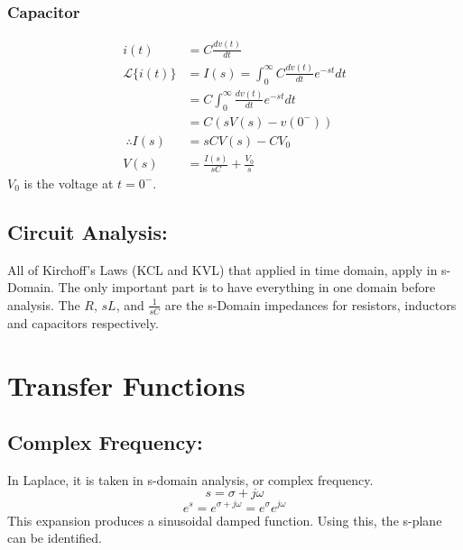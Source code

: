 \documentclass[a5paper]{article}
\newcommand{\Lap}{\mathcal{L}}
\begin{document}
	\subsubsection{Capacitor}
	\begin{align*}
		i(t)&=C\frac{dv(t)}{dt}\\
		\Lap\{i(t)\}&=I(s)=\int^{\infty}_{0}C\frac{dv(t)}{dt}e^{-st}dt\\
		&=C\int^{\infty}_{0}\frac{dv(t)}{dt}e^{-st}dt\\
		&=C(sV(s)-v(0^{-}))\\\
		\therefore I(s)&=sCV(s)-CV_{0}\\
		V(s)&=\frac{I(s)}{sC}+\frac{V_{0}}{s}
	\end{align*}
	$V_{0}$ is the voltage at $t=0^{-}$.
	\subsection{Circuit Analysis:}
	All of Kirchoff's Laws (KCL and KVL) that applied in time domain, apply in s-Domain. The only important part is to have everything in one domain before analysis. The $R$, $sL$, and $\frac{1}{sC}$ are the s-Domain impedances for resistors, inductors and capacitors respectively.

	\section{Transfer Functions}
	\subsection{Complex Frequency:}
	In Laplace, it is taken in s-domain analysis, or complex frequency.
	$$s=\sigma+j\omega$$
	$$e^{s}=e^{\sigma+j\omega}=e^{\sigma}e^{j\omega}$$
	This expansion produces a sinusoidal damped function. Using this, the s-plane can be identified.
	\begin{center}
	\end{center}
\end{document}
